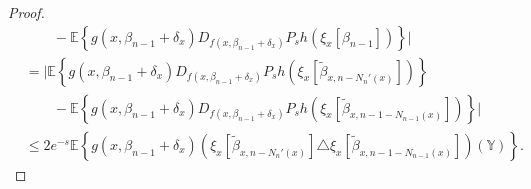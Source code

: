 \documentclass[10pt]{amsart}
\theoremstyle{definition}\newtheorem{defi}[theo]{Definition}\newtheorem{rema}[theo]{Remark}\newtheorem{exam}[theo]{Example}\newtheorem{exem}[theo]{Example}\newtheorem{nota}[theo]{Notation}
\newcommand*\Y{\mathbb{Y}}
\newcommand{\E}{\mathbb{E}}
\newcommand{\mean}[1] {\E\left\{{#1}\right\}}
\begin{document}
\begin{proof}
\begin{align*}
& \qquad - \mean{g\left(x,\beta_{n-1}+\delta_x\right) D_{f\left(x,\beta_{n-1}+\delta_x\right)}P_sh\left(\xi_x\left[\beta_{n-1}\right]\right)} \big| \\
& = \big| \mean{g\left(x,\beta_{n-1}+\delta_x\right) D_{f\left(x,\beta_{n-1}+\delta_x\right)}P_sh\left(\xi_x\left[\widetilde{\beta}_{x,n-N_{n}'(x)}\right]\right) } \\
& \qquad - \mean{g\left(x,\beta_{n-1}+\delta_x\right) D_{f\left(x,\beta_{n-1}+\delta_x\right)}P_sh\left(\xi_x\left[\widetilde{\beta}_{x,n-1-N_{n-1}(x)}\right]\right)} \big| \\
& \leq 2 e^{-s} \mean{ g\left(x,\beta_{n-1}+\delta_x\right) {\left(\xi_x\left[\widetilde{\beta}_{x,n-N_{n}'(x)}\right] \triangle \xi_x\left[\widetilde{\beta}_{x,n-1-N_{n-1}(x)}\right]\right)(\Y)}}.
\end{align*}


\end{proof}
\end{document}

